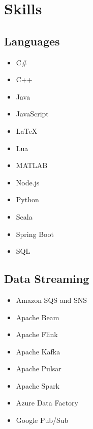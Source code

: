 \documentclass[letterpaper]{resume}
\begin{document}



\begin{minipage}[t]{0.25\columnwidth}


\section{Skills}

\subsection{Languages}
\vspace{2pt}
\begin{itemize}
\item C\#
\item C++
\item Java
\item JavaScript
\item \LaTeX
\item Lua
\item MATLAB
\item Node.js
\item Python
\item Scala
\item Spring Boot
\item SQL
\end{itemize}

\sectionspace

\subsection{Data Streaming}
\vspace{2pt}
\begin{itemize}
\item Amazon SQS and SNS
\item Apache Beam
\item Apache Flink
\item Apache Kafka
\item Apache Pulsar
\item Apache Spark
\item Azure Data Factory
\item Google Pub/Sub
\end{itemize}


\end{minipage}
\end{document}
